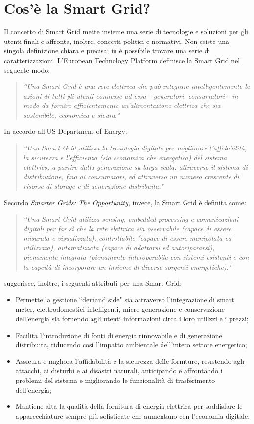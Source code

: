 \section{Cos'è la Smart Grid?}
Il concetto di Smart Grid mette insieme una serie di tecnologie e soluzioni per gli utenti finali e affronta, inoltre, concetti politici e normativi. \newline Non esiste una singola definizione chiara e precisa; in  \cite{smartgrid} è possibile trovare una serie di caratterizzazioni. \newline L'European Technology Platform definisce la Smart Grid nel seguente modo:
\begin{quote}
\textit{``Una Smart Grid è una rete elettrica che può integrare intelligentemente le azioni di tutti gli utenti connesse ad essa - generatori, consumatori - in modo da fornire efficientemente un'alimentazione elettrica che sia sostenibile, economica e sicura."}
\end{quote}
In accordo all'US Department of Energy:
\begin{quote}
\textit{``Una Smart Grid utilizza la tecnologia digitale per migliorare l'affidabilità, la sicurezza e l'efficienza (sia economica che energetica) del sistema elettrico, a partire dalla generazione su larga scala, attraverso il sistema di distribuzione, fino ai consumatori, ed attraverso un numero crescente di risorse di storage e  di generazione distribuita."}
\end{quote}
Secondo 	\emph{Smarter Grids: The Opportunity}, invece, la Smart Grid è definita come:
\begin{quote}
\textit{``Una Smart Grid utilizza sensing, embedded processing e comunicazioni digitali per far sì che la rete elettrica sia osservabile (capace di essere misurata e visualizzata), controllabile (capace di essere manipolata ed utilizzata), automatizzata (capace di adattarsi ed autoripararsi), pienamente integrata (pienamente interoperabile con sistemi esistenti e con la capcità di incorporare un insieme di diverse sorgenti energetiche)."}
\end{quote}
\cite{smartgrid} suggerisce, inoltre, i seguenti attributi per una Smart Grid:
\begin{itemize}
\item Permette la gestione ``demand side" sia attraverso l'integrazione di smart meter, elettrodomestici intelligenti, micro-generazione e conservazione dell'energia sia fornendo agli utenti informazioni circa i loro utilizzi e i prezzi;
\item Facilita l'introduzione di fonti di energia rinnovabile e di generazione distribuita, riducendo così l'impatto ambientale dell'intero settore energetico; 
\item Assicura e migliora l'affidabilità e la sicurezza delle forniture, resistendo agli attacchi, ai disturbi e ai disastri naturali, anticipando e affrontando i problemi del sistema e migliorando le funzionalità di trasferimento dell'energia;
\item Mantiene alta la qualità della fornitura di energia elettrica per soddisfare le apparecchiature sempre più sofisticate che aumentano con l'economia digitale.
\end{itemize}

